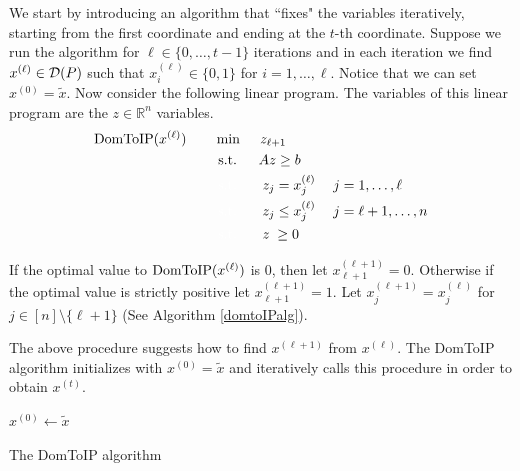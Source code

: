 We start by introducing an algorithm that ``fixes" the variables iteratively, starting from the first coordinate and ending at the $t$-th coordinate. Suppose we run the algorithm for $\ell\in \{0,\ldots,t-1\}$ iterations and in each iteration we find $x^{(\ell)}\in \operatorname{\mathcal{D}}(P)$  such that $x^{(\ell)}_i\in \{0,1\}$ for $i=1,\ldots,\ell$. Notice that we can set $x^{(0)}=\tilde{x}$. Now consider the following linear program. The variables of this linear program are the $z\in \mathbb{R}^n$ variables.
\begin{align}
\DOMtoS(x^{(\ell)})\quad\quad& \min\quad \;z_{\ell+1}\\
&\;\text{s.t.} \quad \;\;Az\geq b \\
&\;{\color{white}{\text{s.t.}} }\quad \;\; \; z_j = x^{(\ell)}_j \quad \; j =1,\ldots, \ell\\
&\;{\color{white}{\text{s.t.}} }\quad \; \;\; z_j \leq x^{(\ell)}_j \quad \; j = \ell+1,\ldots,n\\
&\;{\color{white}{\text{s.t.}} }\quad \; \;\; z\;\geq 0
\end{align}

If the optimal value to $\operatorname{{{DomToIP}}}(x^{(\ell)})$ is 0, then let $x^{(\ell+1)}_{\ell+1} = 0$. Otherwise if the optimal value is strictly positive let $x^{(\ell+1)}_{\ell+1} = 1$. Let $x^{(\ell+1)}_j = x^{(\ell)}_j$ for $j\in [n]\setminus \{\ell+1\}$ (See Algorithm \ref{domtoIPalg}).

The above procedure suggests how to find $x^{(\ell+1)}$ from $x^{(\ell)}$. The DomToIP algorithm initializes with $x^{(0)}=\tilde{x}$ and  iteratively calls this procedure in order to obtain $x^{(t)}$. 

\vspace*{10pt}
\begin{algorithm}[h]
	$x^{(0)}\leftarrow \tilde{x}$\\
	\caption{The DomToIP algorithm}
	\label{domtoIPalg}
\end{algorithm}
\vspace*{10pt}

